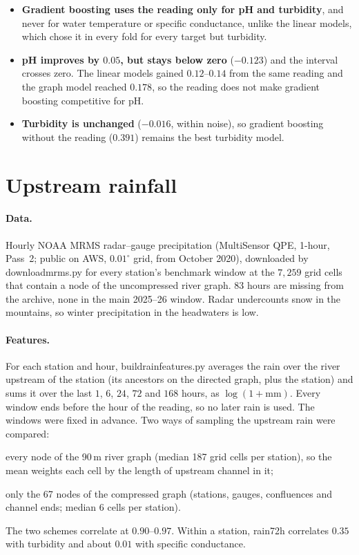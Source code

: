 \documentclass[11pt]{article}
\newcommand{\codeus}{\textunderscore\allowbreak}
\newcommand{\code}[1]{{\ttfamily\let\_\codeus #1}}
\begin{document}
\begin{itemize}
  \item \textbf{Gradient boosting uses the reading only for pH and turbidity}, and never for water
        temperature or specific conductance, unlike the linear models, which chose it in every fold
        for every target but turbidity.
  \item \textbf{pH improves by $0.05$, but stays below zero} ($-0.123$) and the interval crosses
        zero. The linear models gained $0.12$--$0.14$ from the same reading and the graph model
        reached $0.178$, so the reading does not make gradient boosting competitive for pH.
  \item \textbf{Turbidity is unchanged} ($-0.016$, within noise), so gradient boosting without the
        reading ($0.391$) remains the best turbidity model.
\end{itemize}

\section{Upstream rainfall}\label{sec:rain}

\paragraph{Data.} Hourly NOAA MRMS radar--gauge precipitation (MultiSensor QPE, 1-hour, Pass~2;
public on AWS, $0.01^\circ$ grid, from October 2020), downloaded by \code{download\_mrms.py} for
every station's benchmark window at the $7{,}259$ grid cells that contain a node of the uncompressed
river graph. 83 hours are missing from the archive, none in the main 2025--26 window. Radar
undercounts snow in the mountains, so winter precipitation in the headwaters is low.

\paragraph{Features.} For each station and hour, \code{build\_rain\_features.py} averages the rain
over the river upstream of the station (its ancestors on the directed graph, plus the station)
and sums it over the last $1$, $6$, $24$, $72$ and $168$ hours, as $\log(1+\text{mm})$. Every
window ends before the hour of the reading, so no later rain is used. The windows were fixed in
advance. Two ways of sampling the upstream rain were compared:
\begin{description}[leftmargin=1.5em]
  \item[uncompressed] every node of the 90\,m river graph (median 187 grid cells per station), so the
        mean weights each cell by the length of upstream channel in it;
  \item[compressed] only the 67 nodes of the compressed graph (stations, gauges, confluences and
        channel ends; median 6 cells per station).
\end{description}
The two schemes correlate at $0.90$--$0.97$. Within a station, \code{rain\_72h} correlates $0.35$
with turbidity and about $0.01$ with specific conductance.
\end{document}
